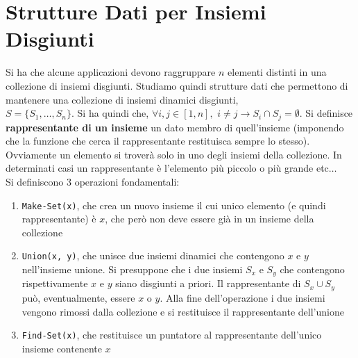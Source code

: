 \documentclass[a4paper,12pt, oneside]{book}
\begin{document}
\chapter{Strutture Dati per Insiemi Disgiunti}
Si ha che alcune applicazioni devono raggruppare $n$ elementi distinti
in una collezione di insiemi disgiunti. Studiamo quindi strutture dati
che permettono di mantenere una collezione di insiemi dinamici
disgiunti, \\
$S=\{S_1,\ldots, S_n\}$. Si ha quindi che, $\forall i,j
\in[1,n],\,\,i\neq j\to S_i \cap S_j=\emptyset$. Si definisce
\textbf{rappresentante di un insieme} un dato membro di
quell'insieme (imponendo che la funzione che cerca il rappresentante
restituisca sempre lo stesso). Ovviamente un elemento si troverà solo
in uno degli insiemi della collezione. In determinati casi un
rappresentante è l'elemento più piccolo o più grande etc$\ldots$\\
Si definiscono 3 operazioni fondamentali:
\begin{enumerate}
  \item \texttt{Make-Set(x)}, che crea un nuovo insieme il cui unico
  elemento (e quindi rappresentante) è $x$, che però non deve essere
  già in un insieme della collezione
  \item \texttt{Union(x, y)}, che unisce due insiemi dinamici che
  contengono $x$ e $y$ nell'insieme unione. Si presuppone che i due
  insiemi $S_x$ e $S_y$ che contengono rispettivamente $x$ e $y$ siano
  disgiunti a priori. Il rappresentante di $S_x\cup S_y$ può,
  eventualmente, essere $x$ o $y$. Alla fine dell'operazione i due
  insiemi vengono rimossi dalla collezione e si restituisce il
  rappresentante dell'unione
  \item \texttt{Find-Set(x)}, che restituisce un puntatore al
  rappresentante dell'unico insieme contenente $x$
\end{enumerate}
\end{document}
